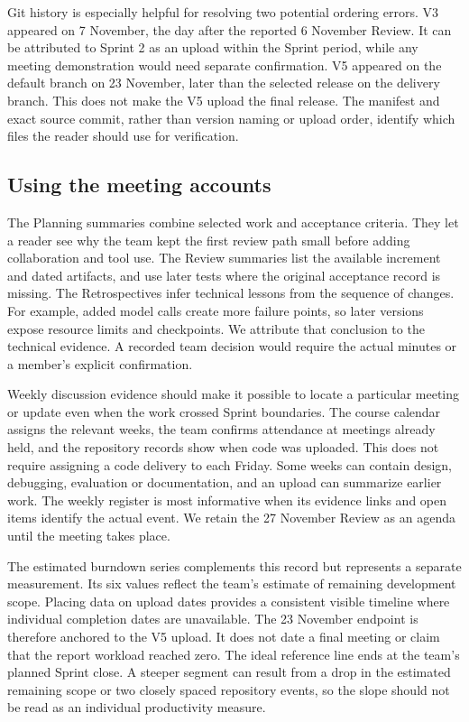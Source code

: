 \documentclass[journal,compsoc]{IEEEtran}
\begin{document}
Git history is especially helpful for resolving two potential ordering errors. V3 appeared on 7 November, the day after the reported 6 November Review. It can be attributed to Sprint 2 as an upload within the Sprint period, while any meeting demonstration would need separate confirmation. V5 appeared on the default branch on 23 November, later than the selected release on the delivery branch. This does not make the V5 upload the final release. The manifest and exact source commit, rather than version naming or upload order, identify which files the reader should use for verification.

\subsection{Using the meeting accounts}
The Planning summaries combine selected work and acceptance criteria. They let a reader see why the team kept the first review path small before adding collaboration and tool use. The Review summaries list the available increment and dated artifacts, and use later tests where the original acceptance record is missing. The Retrospectives infer technical lessons from the sequence of changes. For example, added model calls create more failure points, so later versions expose resource limits and checkpoints. We attribute that conclusion to the technical evidence. A recorded team decision would require the actual minutes or a member's explicit confirmation.

Weekly discussion evidence should make it possible to locate a particular meeting or update even when the work crossed Sprint boundaries. The course calendar assigns the relevant weeks, the team confirms attendance at meetings already held, and the repository records show when code was uploaded. This does not require assigning a code delivery to each Friday. Some weeks can contain design, debugging, evaluation or documentation, and an upload can summarize earlier work. The weekly register is most informative when its evidence links and open items identify the actual event. We retain the 27 November Review as an agenda until the meeting takes place.

The estimated burndown series complements this record but represents a separate measurement. Its six values reflect the team's estimate of remaining development scope. Placing data on upload dates provides a consistent visible timeline where individual completion dates are unavailable. The 23 November endpoint is therefore anchored to the V5 upload. It does not date a final meeting or claim that the report workload reached zero. The ideal reference line ends at the team's planned Sprint close. A steeper segment can result from a drop in the estimated remaining scope or two closely spaced repository events, so the slope should not be read as an individual productivity measure.
\end{document}
